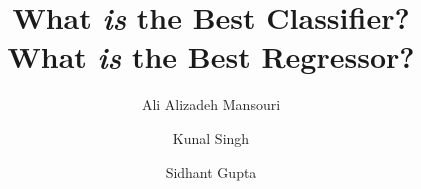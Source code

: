 \documentclass[10pt,twocolumn,letterpaper]{article}
\begin{document}
\title{What {\em is} the Best Classifier?\\
       What {\em is} the Best Regressor?}
\author{Ali Alizadeh Mansouri \and Kunal Singh \and Sidhant Gupta}
\maketitle





















\appendix





\printbibliography[heading=bibintoc]
\end{document}
